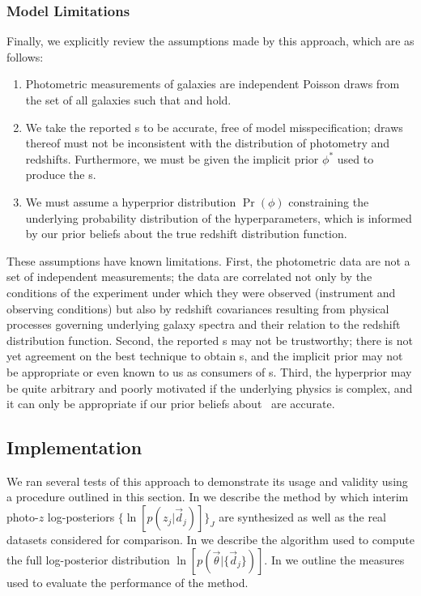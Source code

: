 \subsubsection{Model Limitations}

Finally, we explicitly review the assumptions made by this approach, which are as follows:

\begin{enumerate}
	\item Photometric measurements of galaxies are independent Poisson draws from the set of all galaxies such that  and  hold.
	\item We take the reported \pzip s to be accurate, free of model misspecification; draws thereof must not be inconsistent with the distribution of photometry and redshifts.
	Furthermore, we must be given the implicit prior $\phi^{*}$ used to produce the \pzip s.
	\item We must assume a hyperprior distribution $\Pr(\phi)$ constraining the underlying probability distribution of the hyperparameters, which is informed by our prior beliefs about the true redshift distribution function.
\end{enumerate}

These assumptions have known limitations.  
First, the photometric data are not a set of independent measurements; the data are correlated not only by the conditions of the experiment under which they were observed (instrument and observing conditions) but also by redshift covariances resulting from physical processes governing underlying galaxy spectra and their relation to the redshift distribution function.
Second, the reported \pzip s may not be trustworthy; there is not yet agreement on the best technique to obtain \pzpdf s, and the implicit prior may not be appropriate or even known to us as consumers of \pzip s.  
Third, the hyperprior may be quite arbitrary and poorly motivated if the underlying physics is complex, and it can only be appropriate if our prior beliefs about \nz\ are accurate.

\subsection{Implementation}

We ran several tests of this approach to demonstrate its usage and validity using a procedure outlined in this section.  
In  we describe the method by which interim photo-$z$ log-posteriors $\{\ln[p(z_{j}|\vec{d}_{j})]\}_{J}$ are synthesized as well as the real datasets considered for comparison.  
In  we describe the algorithm used to compute the full log-posterior distribution $\ln[p(\vec{\theta}|\{\vec{d}_{j}\})]$.  
In  we outline the measures used to evaluate the performance of the method.


